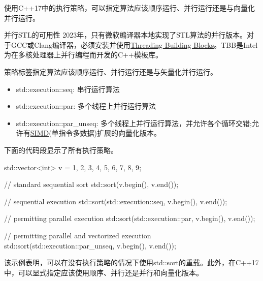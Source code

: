 使用C++17中的执行策略，可以指定算法应该顺序运行、并行运行还是与向量化并行运行。

\begin{myTip}{并行STL的可用性}
2023年，只有微软编译器本地实现了STL算法的并行版本。对于GCC或Clang编译器，必须安装并使用\href{https://en.wikipedia.org/wiki/Threading_Building_Blocks}{Threading Building Blocks}。TBB是Intel为在多核处理器上并行编程而开发的C++模板库。
\end{myTip}


策略标签指定算法应该顺序运行、并行运行还是与矢量化并行运行。

\begin{itemize}
\item 
std::execution::seq: 串行运行算法

\item
std::execution::par: 多个线程上并行运行算法

\item
std::execution::par\_unseq: 多个线程上并行运行算法，并允许各个循环交错;允许有\href{https://en.wikipedia.org/wiki/SIMD}{SIMD}(单指令多数据)扩展的向量化版本。
\end{itemize}

下面的代码段显示了所有执行策略。


\begin{cpp}
std::vector<int> v = {1, 2, 3, 4, 5, 6, 7, 8, 9};

// standard sequential sort
std::sort(v.begin(), v.end());

// sequential execution
std::sort(std::execution::seq, v.begin(), v.end());

// permitting parallel execution
std::sort(std::execution::par, v.begin(), v.end());

// permitting parallel and vectorized execution
std::sort(std::execution::par_unseq, v.begin(), v.end());
\end{cpp}

该示例表明，可以在没有执行策略的情况下使用std::sort的重载。此外，在C++17中，可以显式指定应该使用顺序、并行还是并行和向量化版本。


